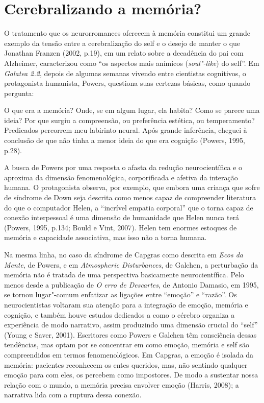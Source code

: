 \chapter{Cerebralizando a memória?}

O tratamento que os neurorromances oferecem à memória constitui um
grande exemplo da tensão entre a cerebralização do self e o desejo de
manter o que Jonathan Franzen (2002, p.19), em um relato sobre a
decadência do pai com Alzheimer, caracterizou como ``os aspectos mais
anímicos (\emph{soul"-like}) do self''. Em \emph{Galatea 2.2}, depois de
algumas semanas vivendo entre cientistas cognitivos, o protagonista
humanista, Powers, questiona suas certezas básicas, como quando
pergunta:

O que era a memória? Onde, se em algum lugar, ela habita? Como se parece
uma ideia? Por que surgiu a compreensão, ou preferência estética, ou
temperamento? Predicados percorrem meu labirinto neural. Após grande
inferência, cheguei à conclusão de que não tinha a menor ideia do que
era cognição (Powers, 1995, p.28).

A busca de Powers por uma resposta o afasta da redução neurocientífica e
o aproxima da dimensão fenomenológica, corporificada e afetiva da
interação humana. O protagonista observa, por exemplo, que embora uma
criança que sofre de síndrome de Down seja descrita como menos capaz de
compreender literatura do que o computador Helen, a ``incrível empatia
corporal'' que o torna capaz de conexão interpessoal é uma dimensão de
humanidade que Helen nunca terá (Powers, 1995, p.134; Bould e Vint,
2007). Helen tem enormes estoques de memória e capacidade associativa,
mas isso não a torna humana.

Na mesma linha, no caso da síndrome de Capgras como descrita em
\emph{Ecos da Mente}, de Powers, e em \emph{Atmospheric Disturbances},
de Galchen, a perturbação da memória não é tratada de uma perspectiva
basicamente neurocientífica. Pelo menos desde a publicação de \emph{O
erro de Descartes}, de Antonio Damasio, em 1995, se tornou lugar"-comum
enfatizar as ligações entre ``emoção'' e ``razão''. Os neurocientistas
voltaram sua atenção para a integração de emoção, memória e cognição, e
também houve estudos dedicados a como o cérebro organiza a experiência
de modo narrativo, assim produzindo uma dimensão crucial do ``self''
(Young e Saver, 2001). Escritores como Powers e Galchen têm consciência
dessas tendências, mas optam por se concentrar em como emoção, memória e
self são compreendidos em termos fenomenológicos. Em Capgras, a emoção é
isolada da memória: pacientes reconhecem os entes queridos, mas, não
sentindo qualquer emoção para com eles, os percebem como impostores. De
modo a sustentar nossa relação com o mundo, a memória precisa envolver
emoção (Harris, 2008); a narrativa lida com a ruptura dessa conexão.

